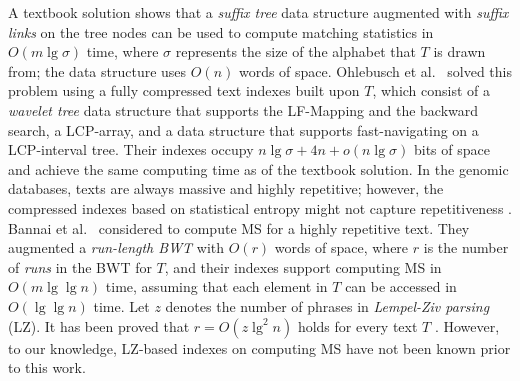 \documentclass[smallabstract,smallcaptions]{dccpaper}
\begin{document}
	A textbook solution \cite{gusfield1997algorithms} shows that a {\em suffix tree} data structure augmented with {\em suffix links} on the tree nodes can be used to compute matching statistics in $O(m\lg \sigma)$ time, where $\sigma$ represents the size of the alphabet that $T$ is drawn from;
	the data structure uses $O(n)$ words of space.
	Ohlebusch et al.~\cite{ohlebusch2010computing} solved this problem using a fully compressed text indexes built upon $T$, which consist of a {\em wavelet tree} data structure that supports the LF-Mapping and the backward search, a LCP-array, and a data structure that supports fast-navigating on a LCP-interval tree. 
	Their indexes occupy $n\lg \sigma+ 4n+o(n\lg \sigma)$ bits of space and achieve the same computing time as of the textbook solution.
	In the genomic databases, texts are always massive and highly repetitive; however, the compressed indexes based on statistical entropy might not capture repetitiveness \cite{navarro2007compressed}.
	Bannai et al.~\cite{bannai2020refining} considered to compute MS for a highly repetitive text.
	They augmented a {\em run-length BWT} with $O(r)$ words of space, where $r$ is the number of {\em runs} in the BWT for $T$, and their indexes support computing MS in $O(m\lg \lg n)$ time, assuming that each element in $T$ can be accessed in $O(\lg \lg n)$ time.
	Let $z$ denotes the number of phrases in {\em Lempel-Ziv parsing} (LZ).
	It has been proved that $r=O(z\lg^2 n)$ holds for every text $T$ \cite{kempa2020resolution}.
	However, to our knowledge, LZ-based indexes on computing MS have not been known prior to this work.
	
\end{document}
